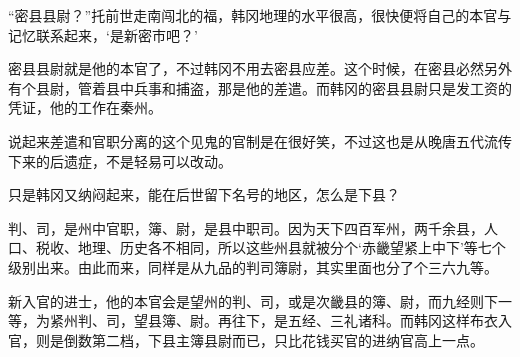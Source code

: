 “密县县尉？”托前世走南闯北的福，韩冈地理的水平很高，很快便将自己的本官与记忆联系起来，‘是新密市吧？’

密县县尉就是他的本官了，不过韩冈不用去密县应差。这个时候，在密县必然另外有个县尉，管着县中兵事和捕盗，那是他的差遣。而韩冈的密县县尉只是发工资的凭证，他的工作在秦州。

说起来差遣和官职分离的这个见鬼的官制是在很好笑，不过这也是从晚唐五代流传下来的后遗症，不是轻易可以改动。

只是韩冈又纳闷起来，能在后世留下名号的地区，怎么是下县？

判、司，是州中官职，簿、尉，是县中职司。因为天下四百军州，两千余县，人口、税收、地理、历史各不相同，所以这些州县就被分个‘赤畿望紧上中下’等七个级别出来。由此而来，同样是从九品的判司簿尉，其实里面也分了个三六九等。

新入官的进士，他的本官会是望州的判、司，或是次畿县的簿、尉，而九经则下一等，为紧州判、司，望县簿、尉。再往下，是五经、三礼诸科。而韩冈这样布衣入官，则是倒数第二档，下县主簿县尉而已，只比花钱买官的进纳官高上一点。

